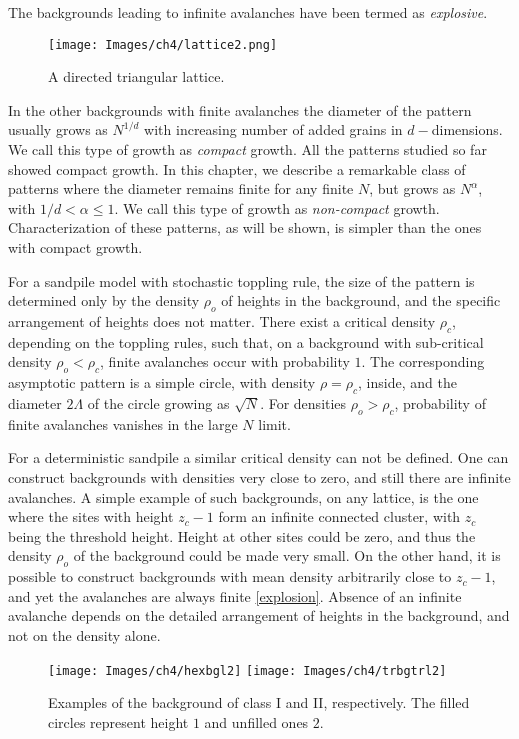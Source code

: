 \documentclass[11pt,a4paper]{book}
\begin{document}
The backgrounds leading to infinite
avalanches have been termed as \textit{explosive}.
\begin{figure}
\begin{center}
\texttt{[image: Images/ch4/lattice2.png]}
\caption{A directed triangular lattice.}
\label{fig:trilattice}
\end{center}
\end{figure}
In the other backgrounds with finite avalanches the diameter of the pattern
usually grows as $N^{1/d}$ with increasing number of added grains in
$d-$dimensions. We call this type of growth as \textit{compact} growth. All the
patterns studied so far showed compact growth. In this chapter, we
describe a remarkable class of patterns where the diameter remains
finite for any finite $N$, but grows as $N^{\alpha}$, with
$1/d<\alpha\le 1$. We call this type of growth as \textit{non-compact} growth.
Characterization of these patterns, as will be shown, is simpler than
the ones with compact growth.

For a sandpile model with stochastic toppling rule, the size of the pattern is
determined only by the density $\rho_{o}$ of heights in the background,
and the specific arrangement of heights does not matter. There exist a
critical density $\rho_{c}$, depending on the toppling rules,
such that, on a background with sub-critical density $\rho_{o} < \rho_{c}$,
finite avalanches occur with probability $1$. The corresponding
asymptotic pattern is a simple circle,
with density $\rho=\rho_{c}$, inside, and
the diameter $2\Lambda$ of the circle growing as $\sqrt{N}$. For densities
$\rho_{o}>\rho_{c}$, probability of finite avalanches vanishes in the
large $N$ limit.

For a deterministic sandpile a similar critical density can not be defined.
One can construct backgrounds with densities very close to zero, and
still there are infinite avalanches. A simple example of such
backgrounds, on any lattice, is the one where the sites with height
$z_{c}-1$ form an infinite connected cluster, with $z_{c}$ being the threshold height.
Height at other sites could be zero, and thus the density
$\rho_{o}$ of the background could be made very small.
On the other hand, it is
possible to construct backgrounds with mean density arbitrarily close to
$z_{c}-1$, and yet the avalanches are always finite \ref{explosion}.
Absence of an infinite avalanche depends on the detailed arrangement
of heights in the background, and not on the density alone.
\begin{figure}
\begin{center}
\texttt{[image: Images/ch4/hexbgl2]}
\texttt{[image: Images/ch4/trbgtrl2]}
\caption{Examples of the background of class I and II, respectively. The filled
circles represent height $1$ and unfilled ones $2$.}
\label{fig:tribg}
\end{center}
\end{figure}
\end{document}

